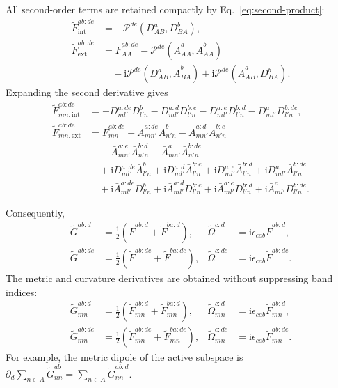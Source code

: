 \documentclass[prx,amsmath,amssymb,superscriptaddress,longbibliography]{revtex4-2}
\newcommand{\ii}{\mathrm{i}}
\begin{document}
All second-order terms are retained compactly by Eq.~\eqref{eq:second-product}:
\begin{align}
 \widetilde F_{\mathrm{int}}^{ab:de}
 &=-\mathscr P^{de}(D_{AB}^a,D_{BA}^b),\nonumber\\
 \widetilde F_{\mathrm{ext}}^{ab:de}
 &=\bar F_{AA}^{ab:de}-\mathscr P^{de}(\bar A_{AA}^a,\bar A_{AA}^b)
 \nonumber\\
 &\quad+\ii\mathscr P^{de}(D_{AB}^a,\bar A_{BA}^b)
       +\ii\mathscr P^{de}(\bar A_{AB}^a,D_{BA}^b).
 \label{eq:Fsecond}
\end{align}
Expanding the second derivative gives
\begin{align}
 \widetilde F_{mn,\mathrm{int}}^{ab:de}
 &=-D_{ml'}^{a:de}D_{l'n}^b-D_{ml'}^{a:d}D_{l'n}^{b:e}
   -D_{ml'}^{a:e}D_{l'n}^{b:d}-D_{ml'}^aD_{l'n}^{b:de},\nonumber\\
 \widetilde F_{mn,\mathrm{ext}}^{ab:de}
 &=\bar F_{mn}^{ab:de}
   -\bar A_{mn'}^{a:de}\bar A_{n'n}^b
   -\bar A_{mn'}^{a:d}\bar A_{n'n}^{b:e}\nonumber\\
 &\quad-\bar A_{mn'}^{a:e}\bar A_{n'n}^{b:d}
   -\bar A_{mn'}^a\bar A_{n'n}^{b:de}\nonumber\\
 &\quad+\ii D_{ml'}^{a:de}\bar A_{l'n}^b
   +\ii D_{ml'}^{a:d}\bar A_{l'n}^{b:e}
   +\ii D_{ml'}^{a:e}\bar A_{l'n}^{b:d}
   +\ii D_{ml'}^a\bar A_{l'n}^{b:de}\nonumber\\
 &\quad+\ii\bar A_{ml'}^{a:de}D_{l'n}^b
   +\ii\bar A_{ml'}^{a:d}D_{l'n}^{b:e}
   +\ii\bar A_{ml'}^{a:e}D_{l'n}^{b:d}
   +\ii\bar A_{ml'}^aD_{l'n}^{b:de}.
 \label{eq:Fsecond-components}
\end{align}

Consequently,
\begin{align}
 \widetilde G^{ab:d}&=\tfrac12(\widetilde F^{ab:d}+\widetilde F^{ba:d}),
 &\widetilde\Omega^{c:d}&=\ii\epsilon_{cab}\widetilde F^{ab:d},\nonumber\\
 \widetilde G^{ab:de}&=\tfrac12(\widetilde F^{ab:de}+\widetilde F^{ba:de}),
 &\widetilde\Omega^{c:de}&=\ii\epsilon_{cab}\widetilde F^{ab:de}.
 \label{eq:geometry-derivatives}
\end{align}
The metric and curvature derivatives are obtained without suppressing band indices:
\begin{align}
 \widetilde G_{mn}^{ab:d}&=\tfrac12(\widetilde F_{mn}^{ab:d}+\widetilde F_{mn}^{ba:d}),
 &\widetilde\Omega_{mn}^{c:d}&=\ii\epsilon_{cab}\widetilde F_{mn}^{ab:d},\nonumber\\
 \widetilde G_{mn}^{ab:de}&=\tfrac12(\widetilde F_{mn}^{ab:de}+\widetilde F_{mn}^{ba:de}),
 &\widetilde\Omega_{mn}^{c:de}&=\ii\epsilon_{cab}\widetilde F_{mn}^{ab:de}.
 \label{eq:geometry-derivative-components}
\end{align}
For example, the metric dipole of the active subspace is
$\partial_d\sum_{n\in A}\widetilde G_{nn}^{ab}
 =\sum_{n\in A}\widetilde G_{nn}^{ab:d}$.
\end{document}
